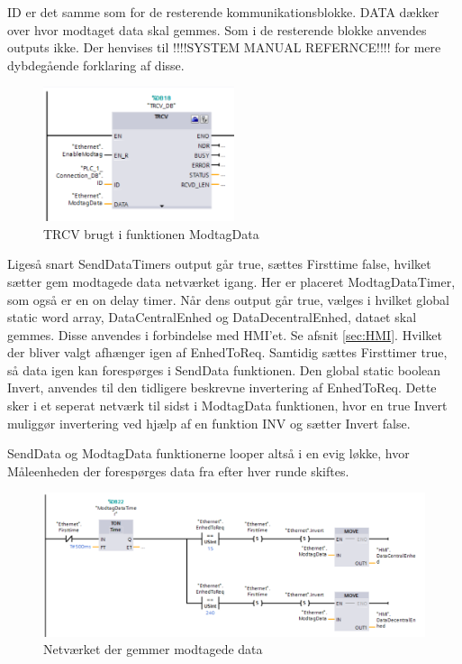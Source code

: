 ID er det samme som for de resterende kommunikationsblokke. DATA dækker over hvor modtaget data skal gemmes. Som i de resterende blokke anvendes outputs ikke. Der henvises til !!!!SYSTEM MANUAL REFERNCE!!!! for mere dybdegående forklaring af disse.

\begin{figure}[H] %
	\centering
	\includegraphics[width=0.5\textwidth]{Figure/TRCV}
	\caption{TRCV brugt i funktionen ModtagData}
	\label{fig:TRCV}
\end{figure}

Ligeså snart SendDataTimers output går true, sættes Firsttime false, hvilket sætter gem modtagede data netværket igang. Her er placeret ModtagDataTimer, som også er en on delay timer. Når dens output går true, vælges i hvilket global static word array, DataCentralEnhed og DataDecentralEnhed, dataet skal gemmes. Disse anvendes i forbindelse med HMI'et. Se afsnit \ref{sec:HMI}. Hvilket der bliver valgt afhænger igen af EnhedToReq. Samtidig sættes Firsttimer true, så data igen kan forespørges i SendData funktionen. Den global static boolean Invert, anvendes til den tidligere beskrevne invertering af EnhedToReq. Dette sker i et seperat netværk til sidst i ModtagData funktionen, hvor en true Invert muliggør invertering ved hjælp af en funktion INV og sætter Invert false.

SendData og ModtagData funktionerne looper altså i en evig løkke, hvor Måleenheden der forespørges data fra efter hver runde skiftes.

\begin{figure}[H] %
	\centering
	\includegraphics[width=1\textwidth]{Figure/GemModtagetData}
	\caption{Netværket der gemmer modtagede data}
	\label{fig:GemModtagetdata}
\end{figure}

